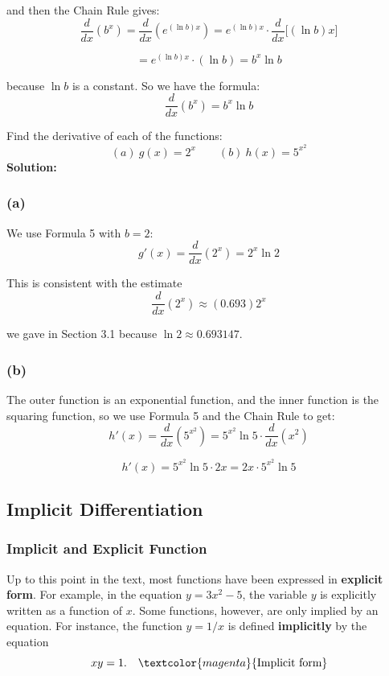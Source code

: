 \documentclass[12pt]{article}
\theoremstyle{beautifulthm}
\begin{document}
and then the Chain Rule gives:
\[
\frac{d}{dx}\left(b^x\right) = \frac{d}{dx} \left(e^{(\ln b)x}\right) = e^{(\ln b)x} \cdot \frac{d}{dx} \big[(\ln b)x\big]
\]

\[
= e^{(\ln b)x} \cdot (\ln b) = b^x \ln b
\]

because \(\ln b\) is a constant. So we have the formula:
\[
\boxed{\frac{d}{dx}\left(b^x\right) = b^x \ln b}
\]


\begin{tcolorbox}[colback=examplebg, colframe=red!75!black, title=\textbf{EXAMPLE 2 : Find the Derivative of the function}, fonttitle=\bfseries, sharp corners]

Find the derivative of each of the functions:
\[
(a) \ g(x) = 2^x \quad \quad (b) \ h(x) = 5^{x^2}
\]
\tcblower
\textbf{Solution:}
\subsubsection*{(a)}

We use Formula 5 with \(b = 2\):
\[
g'(x) = \frac{d}{dx} \left(2^x\right) = 2^x \ln 2
\]

This is consistent with the estimate
\[
\frac{d}{dx} \left(2^x\right) \approx (0.693)2^x
\]

we gave in Section 3.1 because \(\ln 2 \approx 0.693147\).

\subsubsection*{(b)}

The outer function is an exponential function, and the inner function is the squaring function, so we use Formula 5 and the Chain Rule to get:
\[
h'(x) = \frac{d}{dx} \left(5^{x^2}\right) = 5^{x^2} \ln 5 \cdot \frac{d}{dx} \left(x^2\right)
\]

\[
h'(x) = 5^{x^2} \ln 5 \cdot 2x = 2x \cdot 5^{x^2} \ln 5
\]

\end{tcolorbox}

\newpage
\subsection{Implicit Differentiation}
\subsubsection{Implicit and Explicit Function}
Up to this point in the text, most functions have been expressed in \textbf{explicit form}. For example, in the equation \(y = 3x^2 - 5\), the variable \(y\) is explicitly written as a function of \(x\). Some functions, however, are only implied by an equation. For instance, the function \(y = 1/x\) is defined \textbf{implicitly} by the equation
\[
xy = 1. \quad \textcolor{magenta}{\text{Implicit form}}
\]
\end{document}
